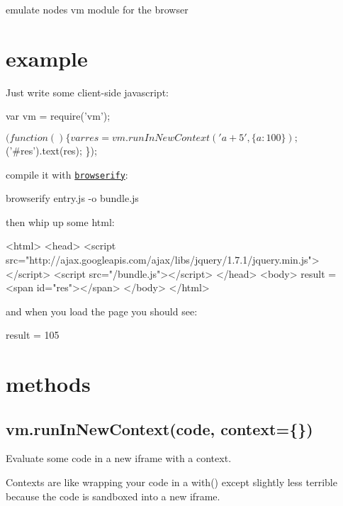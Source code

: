emulate node\textquotesingle{}s vm module for the browser

\href{https://travis-ci.org/browserify/vm-browserify}{\tt }

\section*{example}

Just write some client-\/side javascript\+:


\begin{DoxyCode}
var vm = require('vm');

$(function () \{
    var res = vm.runInNewContext('a + 5', \{ a : 100 \});
    $('#res').text(res);
\});
\end{DoxyCode}


compile it with \href{http://github.com/substack/node-browserify}{\tt browserify}\+:


\begin{DoxyCode}
browserify entry.js -o bundle.js
\end{DoxyCode}


then whip up some html\+:


\begin{DoxyCode}
<html>
  <head>
    <script src="http://ajax.googleapis.com/ajax/libs/jquery/1.7.1/jquery.min.js"></script>
    <script src="/bundle.js"></script>
  </head>
  <body>
    result = <span id="res"></span>
  </body>
</html>
\end{DoxyCode}


and when you load the page you should see\+:


\begin{DoxyCode}
result = 105
\end{DoxyCode}


\section*{methods}

\subsection*{vm.\+run\+In\+New\+Context(code, context=\{\})}

Evaluate some {\ttfamily code} in a new iframe with a {\ttfamily context}.

Contexts are like wrapping your code in a {\ttfamily with()} except slightly less terrible because the code is sandboxed into a new iframe.

